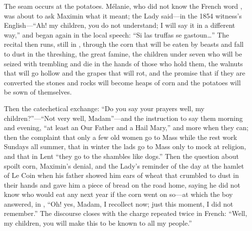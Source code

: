 The  seam occurs at the potatoes. Mélanie, who did not
know the French word , was about to ask
Maximin what it meant; the Lady said---in the 1854 witness's
English---``Ah! my children, you do not understand; I will say it in
a different way,'' and began again in the local speech: ``Si las
truffas se gastoun\ldots'' The recital then runs, still in
, through the corn that will be eaten by beasts and
fall to dust in the threshing, the great famine, the children under
seven who will be seized with trembling and die in the hands of
those who hold them, the walnuts that will go hollow and the grapes
that will rot, and the promise that if they are converted the stones
and rocks will become heaps of corn and the potatoes will be sown of
themselves.

Then the catechetical exchange: ``Do you say your prayers well, my
children?''---``Not very well, Madam''---and the instruction to say
them morning and evening, ``at least an Our Father and a Hail
Mary,'' and more when they can; then the complaint that only a few
old women go to Mass while the rest work Sundays all summer, that in
winter the lads go to Mass only to mock at religion, and that in
Lent ``they go to the shambles like dogs.'' Then the question about
spoilt corn, Maximin's denial, and the Lady's reminder of the day at
the hamlet of Le Coin when his father showed him ears of wheat that
crumbled to dust in their hands and gave him a piece of bread on the
road home, saying he did not know who would eat any next year if the
corn went on so---at which the boy answered, in ,
``Oh! yes, Madam, I recollect now; just this moment, I did not
remember.'' The discourse closes with the charge repeated twice in
French: ``Well, my children, you will make this to be known to all
my people.''

